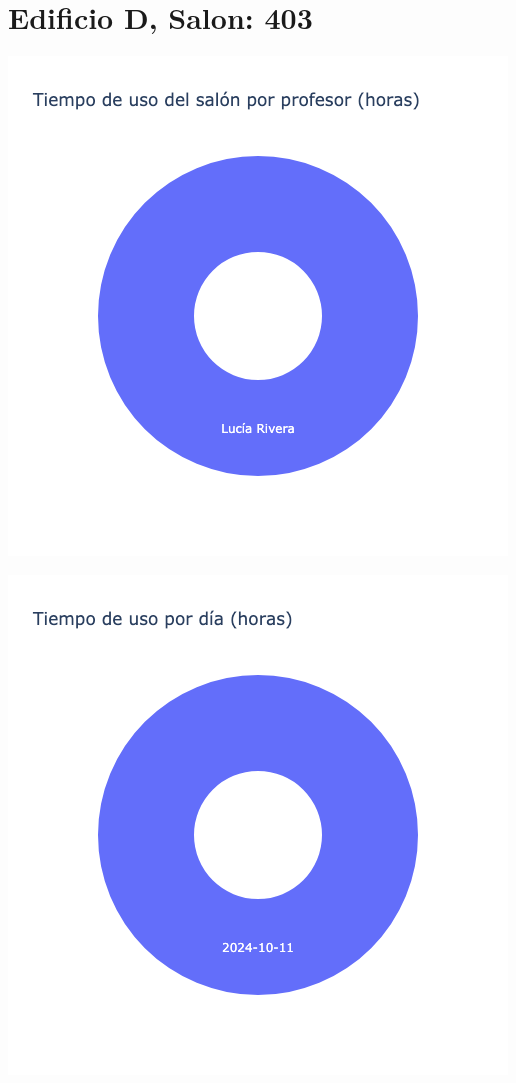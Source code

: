 \documentclass{article}
\begin{document}
    \section{Edificio D, Salon: 403}
    \noindent
    \begin{minipage}{0.48\textwidth}
        \centering
        \includegraphics[width=\textwidth]{../img/pie/UP403-90Dias-03-12-2024.png}
    \end{minipage}
    \hfill
    \begin{minipage}{0.48\textwidth}
        \centering
        \includegraphics[width=\textwidth]{../img/pie/UD403-90Dias-03-12-2024.png}
    \end{minipage}
    
\end{document}
